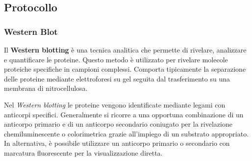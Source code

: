 \subsection{Protocollo}
\subsubsection{Western Blot}
\begin{Informazione}
	Il \textbf{Western blotting} è una tecnica analitica che permette di rivelare, analizzare e quantificare le proteine. Questo metodo è utilizzato per rivelare molecole proteiche specifiche in campioni complessi. Comporta tipicamente la separazione delle proteine mediante elettroforesi su gel seguita dal trasferimento su una membrana di nitrocellulosa.

	\vspace*{.3cm}
	Nel \textit{Western blotting} le proteine vengono identificate mediante legami con anticorpi specifici. Generalmente si ricorre a una opportuna combinazione di un anticorpo primario e di un anticorpo secondario coniugato per la rivelazione chemiluminescente o colorimetrica grazie all'impiego di un substrato appropriato. In alternativa, è possibile utilizzare un anticorpo primario o secondario con marcatura fluorescente per la visualizzazione diretta.
\end{Informazione}

